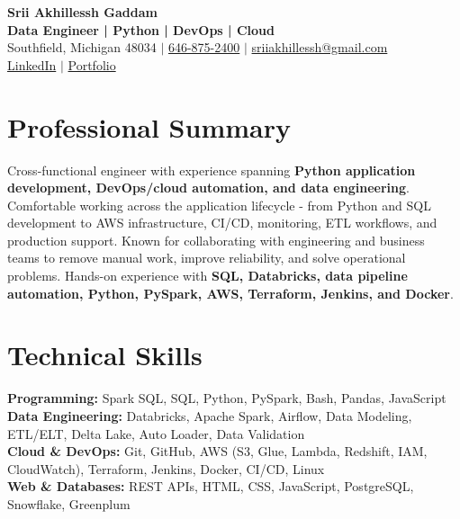 \documentclass[letterpaper,10pt]{article}
\begin{document}
\fontsize{9.35pt}{10.45pt}\selectfont

\begin{center}
    {\LARGE \textbf{Srii Akhillessh Gaddam}} \\[-1pt]
    \textbf{Data Engineer | Python | DevOps | Cloud} \\[2pt]
    Southfield, Michigan 48034 $|$
    \href{tel:6468752400}{646-875-2400} $|$
    \href{mailto:sriiakhillessh@gmail.com}{sriiakhillessh@gmail.com} \\[1pt]
    \href{https://www.linkedin.com/in/srii-akhiilessh-gaddam-b48668191/}{LinkedIn} $|$
    \href{https://sriiakhillesshg.github.io/portfolio/}{Portfolio}
\end{center}
\vspace{-8pt}

\section{Professional Summary}
\small{Cross-functional engineer with experience spanning \textbf{Python application development, DevOps/cloud automation, and data engineering}. Comfortable working across the application lifecycle - from Python and SQL development to AWS infrastructure, CI/CD, monitoring, ETL workflows, and production support. Known for collaborating with engineering and business teams to remove manual work, improve reliability, and solve operational problems. Hands-on experience with \textbf{SQL, Databricks, data pipeline automation, Python, PySpark, AWS, Terraform, Jenkins, and Docker}.}

\section{Technical Skills}
\small{
\textbf{Programming:} Spark SQL, SQL, Python, PySpark, Bash, Pandas, JavaScript \\
\textbf{Data Engineering:} Databricks, Apache Spark, Airflow, Data Modeling, ETL/ELT, Delta Lake, Auto Loader, Data Validation \\
\textbf{Cloud \& DevOps:} Git, GitHub, AWS (S3, Glue, Lambda, Redshift, IAM, CloudWatch), Terraform, Jenkins, Docker, CI/CD, Linux \\
\textbf{Web \& Databases:} REST APIs, HTML, CSS, JavaScript, PostgreSQL, Snowflake, Greenplum
}

\end{document}
